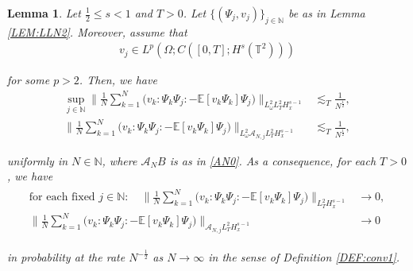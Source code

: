\documentclass[10pt,a4paper]{amsart}
\newtheorem{lemma}{Lemma}
\newcommand{\A}{\mathcal{A}}
\newcommand{\E}{\mathbb{E}}
\newcommand{\N}{\mathbb{N}}
\newcommand{\T}{\mathbb{T}}
\newcommand{\les}{\lesssim}
\newcommand{\noi}{\noindent}
\renewcommand{\o}{\omega}
\newcommand{\too}{\longrightarrow}
\newcommand{\wick}[1]{:\!{#1}\!:}
\begin{document}
\begin{lemma}\label{LEM:LLN4}
Let $\frac 12  \le s < 1$ and $T > 0$.
Let $\{(\Psi_j, v_j)\}_{j \in \N}$ be as in Lemma \ref{LEM:LLN2}.
Moreover, assume that 
\begin{align}
v_j \in L^p (\Omega; C([0, T]; H^{s} (\T^2)))
\label{PN3a}
\end{align}


\noi
for some $p > 2$.
Then, 
we have
\begin{align}
\sup_{j \in \N} \bigg\| \frac 1N \sum_{k = 1}^N \Big( v_k\! \wick{\Psi_k \Psi_j} 
- \E [ v_k\Psi_k ] \Psi_j \Big) \bigg\|_{L^2_\o L_T^2 H_x^{s-1}} 
& \les_T \frac 1{N^\frac 12}, 
\label{PN2} \\
\bigg\| \frac 1N \sum_{k = 1}^N \Big( v_k \!\wick{\Psi_k \Psi_j} - \E [v_k\Psi_k ] \Psi_j \Big) 
\bigg\|_{L^2_\o\A_{N, j}L_T^2 H_x^{s-1}} 
& \les_T \frac 1{N^\frac 12}, 
\label{PN3}
\end{align}



\noi
uniformly in  $N \in \N$, 
where $\A_N B$ is as in \eqref{AN0}.
As a consequence,
for each $T > 0$, we have 
\begin{align}
\begin{split}
\text{for each fixed $j \in \N:$}
\quad 
\bigg\| \frac 1N \sum_{k = 1}^N \Big( v_k\! \wick{\Psi_k \Psi_j} 
- \E [ v_k\Psi_k ] \Psi_j \Big) \bigg\|_{ L_T^2 H_x^{s-1}} 
& \too 0 , \\
\bigg\| \frac 1N \sum_{k = 1}^N \Big( v_k \!\wick{\Psi_k \Psi_j} - \E [v_k\Psi_k ] \Psi_j \Big) 
\bigg\|_{\A_{N, j}L_T^2 H_x^{s-1}} 
& \too 0 
\end{split}
\label{PN4}
\end{align}

\noi
in probability
at the rate $N^{-\frac 12 }$
as $N \to \infty$
in the sense of Definition \ref{DEF:conv1}.



\end{lemma}
\end{document}
